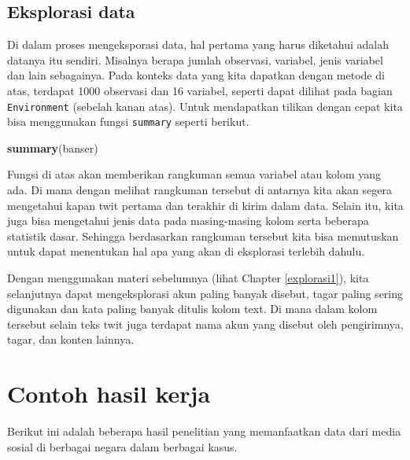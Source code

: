\documentclass[]{book}
\newenvironment{Shaded}{\begin{snugshade}}{\end{snugshade}}
\newcommand{\KeywordTok}[1]{\textcolor[rgb]{0.13,0.29,0.53}{\textbf{#1}}}
\newcommand{\NormalTok}[1]{#1}
\begin{document}
\hypertarget{eksplorasi-data}{%
\section{Eksplorasi data}\label{eksplorasi-data}}

Di dalam proses mengeksporasi data, hal pertama yang harus diketahui
adalah datanya itu sendiri. Misalnya berapa jumlah observasi, variabel,
jenis variabel dan lain sebagainya. Pada konteks data yang kita dapatkan
dengan metode di atas, terdapat 1000 observasi dan 16 variabel, seperti
dapat dilihat pada bagian \texttt{Environment} (sebelah kanan atas).
Untuk mendapatkan tilikan dengan cepat kita bisa menggunakan fungsi
\texttt{summary} seperti berikut.

\begin{Shaded}
\begin{Highlighting}[]
\KeywordTok{summary}\NormalTok{(banser)}
\end{Highlighting}
\end{Shaded}

Fungsi di atas akan memberikan rangkuman semua variabel atau kolom yang
ada. Di mana dengan melihat rangkuman tersebut di antarnya kita akan
segera mengetahui kapan twit pertama dan terakhir di kirim dalam data.
Selain itu, kita juga bisa mengetahui jenis data pada masing-masing
kolom serta beberapa statistik dasar. Sehingga berdasarkan rangkuman
tersebut kita bisa memutuskan untuk dapat menentukan hal apa yang akan
di eksplorasi terlebih dahulu.

Dengan menggunakan materi sebelumnya (lihat Chapter \ref{explorasi1}),
kita selanjutnya dapat mengeksplorasi akun paling banyak disebut, tagar
paling sering digunakan dan kata paling banyak ditulis kolom text. Di
mana dalam kolom tersebut selain teks twit juga terdapat nama akun yang
disebut oleh pengirimnya, tagar, dan konten lainnya.

\hypertarget{contoh-hasil-kerja}{%
\chapter{Contoh hasil kerja}\label{contoh-hasil-kerja}}

Berikut ini adalah beberapa hasil penelitian yang memanfaatkan data dari
media sosial di berbagai negara dalam berbagai kasus.
\end{document}
